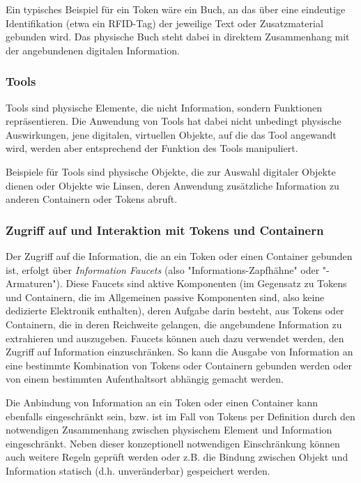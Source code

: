 Ein typisches Beispiel für ein Token wäre ein Buch, an das über eine eindeutige Identifikation (etwa ein \gls{RFID}-Tag) der jeweilige Text oder Zusatzmaterial gebunden wird. Das physische Buch steht dabei in direktem Zusammenhang mit der angebundenen digitalen Information.

\subsubsection{Tools}
Tools sind physische Elemente, die nicht Information, sondern Funktionen repräsentieren. Die Anwendung von Tools hat dabei nicht unbedingt physische Auswirkungen, jene digitalen, virtuellen Objekte, auf die das Tool angewandt wird, werden aber entsprechend der Funktion des Tools manipuliert.

Beispiele für Tools sind physische Objekte, die zur Auswahl digitaler Objekte dienen oder Objekte wie Linsen, deren Anwendung zusätzliche Information zu anderen Containern oder Tokens abruft.

\subsubsection{Zugriff auf und Interaktion mit Tokens und Containern}

Der Zugriff auf die Information, die an ein Token oder einen Container gebunden ist, erfolgt über \emph{Information Faucets} (also "Informations-Zapfhähne" oder "-Armaturen"). Diese Faucets sind aktive Komponenten (im Gegensatz zu Tokens und Containern, die im Allgemeinen passive Komponenten sind, also keine dedizierte Elektronik enthalten), deren Aufgabe darin besteht, aus Tokens oder Containern, die in deren Reichweite gelangen, die angebundene Information zu extrahieren und auszugeben. Faucets können auch dazu verwendet werden, den Zugriff auf Information einzuschränken. So kann die Ausgabe von Information an eine bestimmte Kombination von Tokens oder Containern gebunden werden oder von einem bestimmten Aufenthaltsort abhängig gemacht werden.

Die Anbindung von Information an ein Token oder einen Container kann ebenfalls eingeschränkt sein, bzw. ist im Fall von Tokens per Definition durch den notwendigen Zusammenhang zwischen physischem Element und Information eingeschränkt. Neben dieser konzeptionell notwendigen Einschränkung können auch weitere Regeln geprüft werden oder z.B. die Bindung zwischen Objekt und Information statisch (d.h. unveränderbar) gespeichert werden. 

